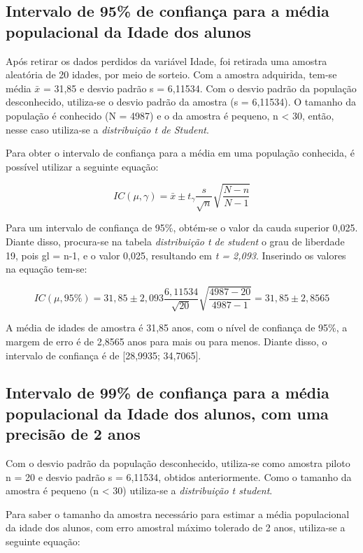 \subsection{Intervalo de 95\% de confiança para a média populacional da Idade dos alunos}
\label{sub:1a}
Após retirar os dados perdidos da variável Idade, foi retirada uma amostra aleatória de 20 idades, por meio de sorteio. Com a amostra adquirida, tem-se média $\bar{x}$ = 31,85 e desvio padrão s 
= 6,11534. Com o desvio padrão da população desconhecido, utiliza-se o desvio padrão da amostra (s = 6,11534). O tamanho da população é conhecido (N = 4987) e o da amostra é pequeno, n < 30, então, 
nesse caso utiliza-se a \textit{distribuição t de Student}.

Para obter o intervalo de confiança para a média em uma população conhecida, é possível utilizar a seguinte equação:

\begin{equation*}
 IC (\mu, \gamma) = \bar{x} \pm t_\gamma \frac{s}{\sqrt{n}} \sqrt{\frac{N-n}{N-1}}
\end{equation*}

Para um intervalo de confiança de 95\%, obtém-se o valor da cauda superior 0,025. Diante disso, procura-se na tabela \textit{distribuição t de student} o grau de liberdade 19, pois gl = n-1, e o 
valor 0,025, resultando em \textit{t = 2,093}. Inserindo os valores na equação tem-se:

\begin{equation*}
 IC (\mu, 95\%) = 31,85 \pm 2,093 \frac{6,11534}{\sqrt{20}} \sqrt{\frac{4987 - 20}{4987 - 1}} 
                = 31,85 \pm 2,8565
\end{equation*}

A média de idades de amostra é 31,85 anos, com o nível de confiança de 95\%, a margem de erro é de 2,8565 anos para mais ou para menos. Diante disso, o intervalo de confiança é de [28,9935; 34,7065].

\subsection{Intervalo de 99\% de confiança para a média populacional da Idade dos alunos, com uma precisão de 2 anos}

Com o desvio padrão da população desconhecido, utiliza-se como amostra piloto n = 20 e desvio padrão s = 6,11534, obtidos anteriormente. Como o tamanho da amostra é pequeno (n < 30) utiliza-se a 
\textit{distribuição t student}.

Para saber o tamanho da amostra necessário para estimar a média populacional da idade dos alunos, com erro amostral máximo tolerado de 2 anos, utiliza-se a seguinte equação:

